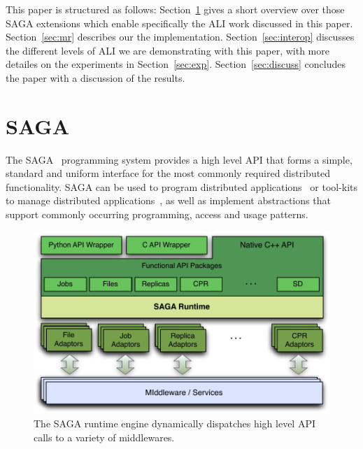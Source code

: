 \documentclass[3p,twocolumn]{elsarticle}
\begin{document}

This paper is structured as follows: Section~\ref{sec:saga} gives
a short overview over those SAGA extensions which enable specifically
the ALI work discussed in this paper.  Section~\ref{sec:mr} describes
our the \smr implementation.  Section~\ref{sec:interop} discusses the
different levels of ALI we are demonstrating with this paper, with more
detailes on the experiments in Section~\ref{sec:exp}.
Section~\ref{sec:discuss} concludes the paper with a discussion of the
results.








\section{SAGA}
\label{sec:saga}

The SAGA~\cite{saga-core, Kaiser:2006qp} programming system provides a
high level API that forms a simple, standard and uniform interface for
the most commonly required distributed functionality.  SAGA can be
used to program distributed applications~\cite{saga_escience07,
saga_tg08} or tool-kits to manage distributed
applications~\cite{Luckow:2008xy}, as well as implement abstractions
that support commonly occurring programming, access and usage
patterns.

\begin{figure}[t]
 \includegraphics[scale=0.5]{saga-figure02.pdf}
 \caption{The SAGA runtime engine dynamically dispatches high level
          API calls to a variety of middlewares.}
 \label{fig:saga}
\end{figure}
\end{document}
